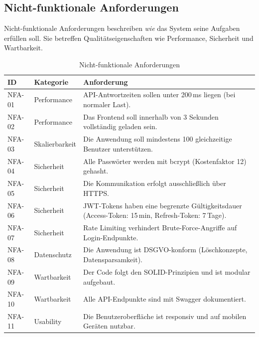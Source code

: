 \subsection{Nicht-funktionale Anforderungen}
\label{sec:nichtfunktionale-anforderungen}

Nicht-funktionale Anforderungen beschreiben \textit{wie} das System
seine Aufgaben erfüllen soll. Sie betreffen Qualitätseigenschaften
wie Performance, Sicherheit und Wartbarkeit.

\begin{table}[H]
    \centering
    \caption{Nicht-funktionale Anforderungen}
    \begin{tabularx}{\textwidth}{llX}
        \toprule
        \textbf{ID} & \textbf{Kategorie} & \textbf{Anforderung} \\
        \midrule
        NFA-01 & Performance
          & API-Antwortzeiten sollen unter 200\,ms liegen
            (bei normaler Last). \\
        NFA-02 & Performance
          & Das Frontend soll innerhalb von 3 Sekunden vollständig
            geladen sein. \\
        NFA-03 & Skalierbarkeit
          & Die Anwendung soll mindestens 100 gleichzeitige
            Benutzer unterstützen. \\
        NFA-04 & Sicherheit
          & Alle Passwörter werden mit bcrypt (Kostenfaktor 12)
            gehasht. \\
        NFA-05 & Sicherheit
          & Die Kommunikation erfolgt ausschließlich über HTTPS. \\
        NFA-06 & Sicherheit
          & \ac{JWT}-Tokens haben eine begrenzte Gültigkeitsdauer
            (Access-Token: 15\,min, Refresh-Token: 7\,Tage). \\
        NFA-07 & Sicherheit
          & Rate Limiting verhindert Brute-Force-Angriffe
            auf Login-Endpunkte. \\
        NFA-08 & Datenschutz
          & Die Anwendung ist \ac{DSGVO}-konform (Löschkonzepte,
            Datensparsamkeit). \\
        NFA-09 & Wartbarkeit
          & Der Code folgt den SOLID-Prinzipien und ist modular
            aufgebaut. \\
        NFA-10 & Wartbarkeit
          & Alle API-Endpunkte sind mit Swagger dokumentiert. \\
        NFA-11 & Usability
          & Die Benutzeroberfläche ist responsiv und auf mobilen
            Geräten nutzbar. \\

\end{tabularx}
\end{table}
